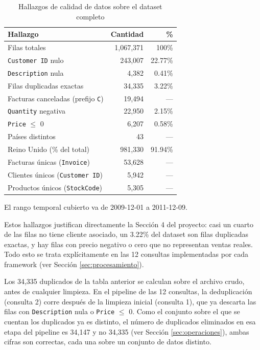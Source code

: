\begin{table}[H]
\centering
\begin{tabular}{lrr}
\toprule
\textbf{Hallazgo} & \textbf{Cantidad} & \textbf{\%} \\
\midrule
Filas totales & 1{,}067{,}371 & 100\% \\
\texttt{Customer ID} nulo & 243{,}007 & 22.77\% \\
\texttt{Description} nula & 4{,}382 & 0.41\% \\
Filas duplicadas exactas & 34{,}335 & 3.22\% \\
Facturas canceladas (prefijo \texttt{C}) & 19{,}494 & --- \\
\texttt{Quantity} negativa & 22{,}950 & 2.15\% \\
\texttt{Price} $\leq$ 0 & 6{,}207 & 0.58\% \\
Países distintos & 43 & --- \\
Reino Unido (\% del total) & 981{,}330 & 91.94\% \\
Facturas únicas (\texttt{Invoice}) & 53{,}628 & --- \\
Clientes únicos (\texttt{Customer ID}) & 5{,}942 & --- \\
Productos únicos (\texttt{StockCode}) & 5{,}305 & --- \\
\bottomrule
\end{tabular}
\caption{Hallazgos de calidad de datos sobre el dataset completo}
\end{table}

El rango temporal cubierto va de 2009-12-01 a 2011-12-09.

Estos hallazgos justifican directamente la Sección 4 del proyecto: casi un cuarto de las filas no tiene cliente asociado, un 3.22\% del dataset son filas duplicadas exactas, y hay filas con precio negativo o cero que no representan ventas reales. Todo esto se trata explícitamente en las 12 consultas implementadas por cada framework (ver Sección \ref{sec:procesamiento}).

Los 34{,}335 duplicados de la tabla anterior se calculan sobre el archivo crudo, antes de cualquier limpieza. En el pipeline de las 12 consultas, la deduplicación (consulta 2) corre después de la limpieza inicial (consulta 1), que ya descarta las filas con \texttt{Description} nula o \texttt{Price} $\leq$ 0. Como el conjunto sobre el que se cuentan los duplicados ya es distinto, el número de duplicados eliminados en esa etapa del pipeline es 34{,}147 y no 34{,}335 (ver Sección \ref{sec:operaciones}), ambas cifras son correctas, cada una sobre un conjunto de datos distinto.

